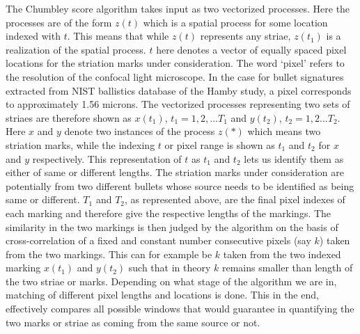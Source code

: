 \documentclass[12pt]{article}
\begin{document}
The Chumbley score algorithm takes input as two vectorized processes.
Here the processes are of the form \(z(t)\) which is a spatial process
for some location indexed with \(t\). This means that while \(z(t)\)
represents any striae, \(z(t_1)\) is a realization of the spatial
process. \(t\) here denotes a vector of equally spaced pixel locations
for the striation marks under consideration. The word `pixel' refers to
the resolution of the confocal light microscope. In the case for bullet
signatures extracted from NIST ballistics database \citep{nist} of the
Hamby study, a pixel corresponds to approximately 1.56 microns. The
vectorized processes representing two sets of striaes are therefore
shown as \(x(t_1)\), \(t_1 = 1,2,...T_1\) and \(y(t_2)\),
\(t_2 = 1,2...T_2\). Here \(x\) and \(y\) denote two instances of the
process \(z(*)\) which means two striation marks, while the indexing
\(t\) or pixel range is shown as \(t_1\) and \(t_2\) for \(x\) and \(y\)
respectively. This representation of \(t\) as \(t_1\) and \(t_2\) lets
us identify them as either of same or different lengths. The striation
marks under consideration are potentially from two different bullets
whose source needs to be identified as being same or different. \(T_1\)
and \(T_2\), as represented above, are the final pixel indexes of each
marking and therefore give the respective lengths of the markings. The
similarity in the two markings is then judged by the algorithm on the
basis of cross-correlation of a fixed and constant number consecutive
pixels (say \(k\)) taken from the two markings. This can for example be
\(k\) taken from the two indexed marking \(x(t_1)\) and \(y(t_2)\) such
that in theory \(k\) remains smaller than length of the two striae or
marks. Depending on what stage of the algorithm we are in, matching of
different pixel lengths and locations is done. This in the end,
effectively compares all possible windows that would guarantee in
quantifying the two marks or striae as coming from the same source or
not.
\end{document}
